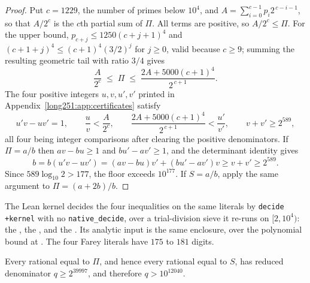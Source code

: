 \documentclass[11pt]{article}
\begin{document}
\begin{proof}
Put $c=1229$, the number of primes below $10^4$, and
$A=\sum_{i=0}^{c-1}p_i2^{\,c-i-1}$, so that $A/2^{c}$ is the $c$th partial sum
of $\Pi$.  All terms are positive, so $A/2^{c}\le\Pi$.  For the upper bound,
$p_{c+j}\le1250(c+j+1)^4$ and $(c+1+j)^4\le(c+1)^4(3/2)^{j}$ for $j\ge0$, valid
because $c\ge9$; summing the resulting geometric tail with ratio $3/4$ gives
\[
 \frac{A}{2^{c}}\;\le\;\Pi\;\le\;\frac{2A+5000(c+1)^4}{2^{\,c+1}} .
\]
The four positive integers $u,v,u',v'$ printed in
Appendix~\ref{long251:app:certificates} satisfy
\[
 u'v-uv'=1,\qquad
 \frac uv<\frac{A}{2^{c}},\qquad
 \frac{2A+5000(c+1)^4}{2^{\,c+1}}<\frac{u'}{v'},\qquad
 v+v'\ge2^{589},
\]
all four being integer comparisons after clearing the positive denominators.
If $\Pi=a/b$ then $av-bu\ge1$ and $bu'-av'\ge1$, and the determinant identity
gives
\[
 b=b(u'v-uv')=(av-bu)v'+(bu'-av')v\ge v+v' \ge 2^{589}.
\]
Since $589\log_{10}2>177$, the floor exceeds $10^{177}$.  If $S=a/b$, apply the
same argument to $\Pi=(a+2b)/b$.
\end{proof}

\noindent The Lean kernel decides the four inequalities on the same literals by
\texttt{decide +kernel} with no \texttt{native\_decide}, over a trial-division
sieve it re-runs on $[2,10^4)$: the
,
the
, and the
.  Its analytic input is the same enclosure, over the
polynomial bound at
.
The four Farey literals have $175$ to $181$ digits.

\begin{theorem}\label{long251:res:cfexclusion}
Every rational equal to $\Pi$, and hence every rational equal to $S$, has
reduced denominator $q\ge2^{39997}$, and therefore $q>10^{12040}$.
\end{theorem}
\end{document}
